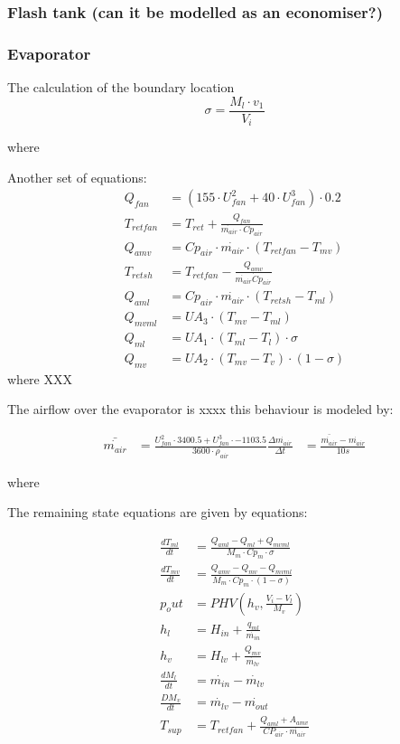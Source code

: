 \subsubsection{Flash tank (can it be modelled as an economiser?)}

\subsubsection{Evaporator}

The calculation of the boundary location 
\begin{equation}
	\sigma = \frac{M_l \cdot v_1}{V_i}
\end{equation}

where


Another set of equations:
\begin{align}
	Q_{fan} 		& = (155 \cdot U_{fan}^2 + 40 \cdot U_{fan}^3) \cdot 0.2 \\
	T_{retfan} 		& = T_{ret} + \frac{Q_{fan}}{\dot{m_{air}} \cdot Cp_{air}} \\
	Q_{amv} 		& = Cp_{air} \cdot \dot{m_{air}} \cdot (T_{retfan} - T_{mv}) \\
	T_{retsh} 		& = T_{retfan} - \frac{Q_{amv}}{\dot{m_{air}} \dot Cp_{air}} \\
	Q_{aml} 		& = Cp_{air} \cdot \dot{m_{air}} \cdot (T_{retsh} - T_{ml}) \\
	Q_{mvml} 		& = U A_3 \cdot (T_{mv} - T_{ml}) \\
	Q_{ml} 			& = U A_1 \cdot (T_{ml} - T_l) \cdot \sigma\\
	Q_{mv} 			& = U A_2 \cdot (T_{mv} - T_v) \cdot (1- \sigma)
\end{align}
where
XXX

The airflow over the evaporator is xxxx this behaviour is modeled by:

\begin{align}
	\bar{\dot{m_{air}}} & = \frac{U_{fan}^2 \cdot 3400.5 + U_{fan}^3 \cdot -1103.5} {3600 \cdot \rho_{air}}
	\frac{\Delta \dot{m_{air}}}{\Delta t} & = \frac{\bar{\dot{m_{air}}} - \dot{m_{air}}} {10s}
\end{align}

where

The remaining state equations are given by equations:

\begin{align}
	\frac{dT_{ml}}{dt} & = \frac{Q_{aml}-Q_{ml} + Q_{mvml}}{M_m \cdot Cp_m \cdot \sigma} \\
	\frac{dT_{mv}}{dt} & = \frac{Q_{amv} - Q_{mv} - Q_{mvml}}{M_m \cdot Cp_m \cdot (1- \sigma)} \\
	p_out & = PHV \left( h_v, \frac{V_i-V_l}{M_v} \right)\\
	h_l & = H_{in} + \frac{q_{ml}}{\dot{m_{in}}}\\
	h_v & = H_{lv} + \frac{Q_{mv}}{\dot{m_{lv}}}\\
	\frac{dM_l}{dt} & = \dot{m_{in}} - \dot{m_{lv}}\\
	\frac{DM_v}{dt} & = \dot{m_{lv}} - \dot{m_{out}}\\
	T_{sup} & = T_{retfan} +  \frac{Q_{aml} + A_{amv}}{CP_{air} \cdot \dot{m_{air}}}
\end{align}

